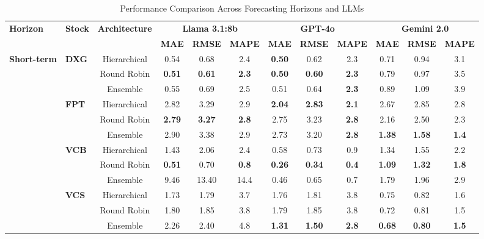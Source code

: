 \begin{table}[!h]
\centering
\caption{Performance Comparison Across Forecasting Horizons and LLMs}
\label{tab:full_performance_all}
\setlength{\tabcolsep}{3pt}
\renewcommand{\arraystretch}{1.05}
\scriptsize
\begin{tabular}{llcccc|ccc|ccc}
\toprule
\multirow{2}{*}{\textbf{Horizon}} &
\multirow{2}{*}{\textbf{Stock}} &
\multirow{2}{*}{\textbf{Architecture}} &
\multicolumn{3}{c|}{\textbf{Llama 3.1:8b}} &
\multicolumn{3}{c|}{\textbf{GPT-4o}} &
\multicolumn{3}{c}{\textbf{Gemini 2.0}} \\
\cmidrule(lr){4-6} \cmidrule(lr){7-9} \cmidrule(lr){10-12}
& & & \textbf{MAE} & \textbf{RMSE} & \textbf{MAPE} & \textbf{MAE} & \textbf{RMSE} & \textbf{MAPE} & \textbf{MAE} & \textbf{RMSE} & \textbf{MAPE} \\
\midrule

\multirow{12}{*}{\textbf{Short-term}}
& \multirow{3}{*}{\textbf{DXG}} & Hierarchical & 0.54 & 0.68 & 2.4 & \textbf{0.50} & 0.62 & 2.3 & 0.71 & 0.94 & 3.1 \\
& & Round Robin & \textbf{0.51} & \textbf{0.61} & \textbf{2.3} & \textbf{0.50} & \textbf{0.60} & \textbf{2.3} & 0.79 & 0.97 & 3.5 \\
& & Ensemble & 0.55 & 0.69 & 2.5 & 0.51 & 0.64 & \textbf{2.3} & 0.89 & 1.09 & 3.9 \\
& \multirow{3}{*}{\textbf{FPT}} & Hierarchical & 2.82 & 3.29 & 2.9 & \textbf{2.04} & \textbf{2.83} & \textbf{2.1} & 2.67 & 2.85 & 2.8 \\
& & Round Robin & \textbf{2.79} & \textbf{3.27} & \textbf{2.8} & 2.75 & 3.23 & \textbf{2.8} & 2.16 & 2.50 & 2.3 \\
& & Ensemble & 2.90 & 3.38 & 2.9 & 2.73 & 3.20 & \textbf{2.8} & \textbf{1.38} & \textbf{1.58} & \textbf{1.4} \\
& \multirow{3}{*}{\textbf{VCB}} & Hierarchical & 1.43 & 2.06 & 2.4 & 0.58 & 0.73 & 0.9 & 1.34 & 1.55 & 2.2 \\
& & Round Robin & \textbf{0.51} & 0.70 & \textbf{0.8} & \textbf{0.26} & \textbf{0.34} & \textbf{0.4} & \textbf{1.09} & \textbf{1.32} & \textbf{1.8} \\
& & Ensemble & 9.46 & 13.40 & 14.4 & 0.46 & 0.65 & 0.7 & 1.79 & 1.96 & 2.9 \\
& \multirow{3}{*}{\textbf{VCS}} & Hierarchical & 1.73 & 1.79 & 3.7 & 1.76 & 1.81 & 3.8 & 0.75 & 0.82 & 1.6 \\
& & Round Robin & 1.80 & 1.85 & 3.8 & 1.79 & 1.85 & 3.8 & 0.72 & 0.81 & 1.5 \\
& & Ensemble & 2.26 & 2.40 & 4.8 & \textbf{1.31} & \textbf{1.50} & \textbf{2.8} & \textbf{0.68} & \textbf{0.80} & \textbf{1.5} \\
\midrule


\end{tabular}
\end{table}
